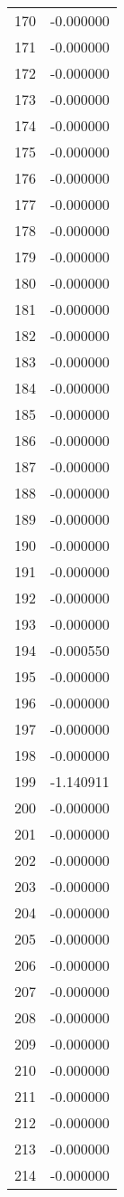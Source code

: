 \documentclass[12pt]{article}
\begin{document}
\begin{longtable}{@{}cc@{}}
170 & -0.000000 \\
171 & -0.000000 \\
172 & -0.000000 \\
173 & -0.000000 \\
174 & -0.000000 \\
175 & -0.000000 \\
176 & -0.000000 \\
177 & -0.000000 \\
178 & -0.000000 \\
179 & -0.000000 \\
180 & -0.000000 \\
181 & -0.000000 \\
182 & -0.000000 \\
183 & -0.000000 \\
184 & -0.000000 \\
185 & -0.000000 \\
186 & -0.000000 \\
187 & -0.000000 \\
188 & -0.000000 \\
189 & -0.000000 \\
190 & -0.000000 \\
191 & -0.000000 \\
192 & -0.000000 \\
193 & -0.000000 \\
194 & -0.000550 \\
195 & -0.000000 \\
196 & -0.000000 \\
197 & -0.000000 \\
198 & -0.000000 \\
199 & -1.140911 \\
200 & -0.000000 \\
201 & -0.000000 \\
202 & -0.000000 \\
203 & -0.000000 \\
204 & -0.000000 \\
205 & -0.000000 \\
206 & -0.000000 \\
207 & -0.000000 \\
208 & -0.000000 \\
209 & -0.000000 \\
210 & -0.000000 \\
211 & -0.000000 \\
212 & -0.000000 \\
213 & -0.000000 \\
214 & -0.000000 \\

\end{longtable}
\end{document}
